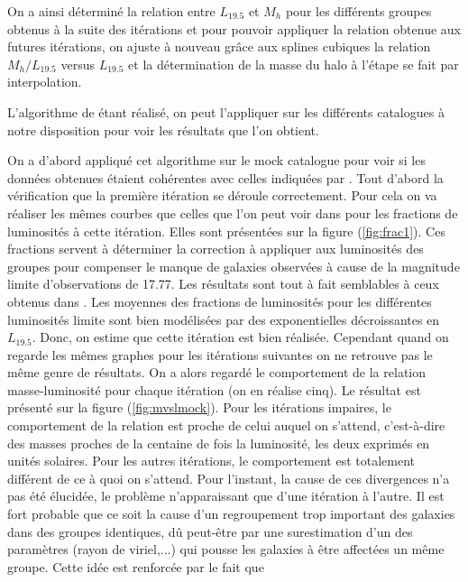 On a ainsi déterminé la relation entre $L_{\num{19,5}}$ et $M_h$ pour les différents groupes obtenus à la suite des itérations
et pour pouvoir appliquer la relation obtenue aux futures itérations, on ajuste à nouveau grâce aux splines cubiques la relation
$M_h/L_{\num{19,5}}$ versus $L_{\num{19,5}}$ et la détermination de la masse du halo à l'étape  se fait par interpolation.

L'algorithme de \citet{Yang+07} étant réalisé, on peut l'appliquer sur les différents catalogues à notre disposition pour voir les
résultats que l'on obtient.

On a d'abord appliqué cet algorithme sur le mock catalogue pour voir si les données obtenues étaient cohérentes avec celles
indiquées par \citet{Yang+07}. Tout d'abord la vérification que la première itération se déroule correctement. Pour cela on va
réaliser les mêmes courbes que celles que l'on peut voir dans \citet{Yang+07} pour les fractions de luminosités à cette itération.
Elles sont présentées sur la figure (\ref{fig:frac1}). Ces fractions servent à déterminer la correction à appliquer aux luminosités
des groupes pour compenser le manque de galaxies observées à cause de la magnitude limite d'observations de 17.77. Les résultats
sont tout à fait semblables à ceux obtenus dans \citet{Yang+07}. Les moyennes des fractions de luminosités pour les différentes
luminosités limite sont bien modélisées par des exponentielles décroissantes en $L_{19.5}$. Donc, on estime que cette itération est
bien réalisée. Cependant quand on regarde les mêmes graphes pour les itérations suivantes on ne retrouve pas le même genre de
résultats. On a alors regardé le comportement de la relation masse-luminosité pour chaque itération (on en réalise cinq). Le
résultat est présenté sur la figure (\ref{fig:mvslmock}). Pour les itérations impaires, le comportement de la relation est proche
de celui auquel on s'attend, c'est-à-dire des masses proches de la centaine de fois la luminosité, les deux exprimés en unités
solaires. Pour les autres itérations, le comportement est totalement différent de ce à quoi on s'attend. Pour l'instant, la cause
de ces divergences n'a pas été élucidée, le problème n'apparaissant que d'une itération à l'autre. Il est fort probable que ce soit
la cause d'un regroupement trop important des galaxies dans des groupes identiques, dû peut-être par une surestimation d'un des
paramètres (rayon de viriel,...) qui pousse les galaxies à être affectées un même groupe. Cette idée est renforcée par le fait que
